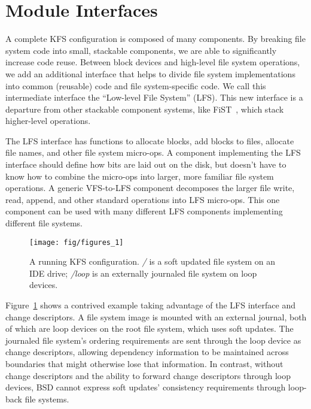 \section {Module Interfaces}
\label{sec:interfaces}

A complete KFS configuration is composed of many components. By breaking file
system code into small, stackable components, we are able to significantly
increase code reuse. Between block devices and high-level file system
operations, we add an additional interface that helps to divide file system
implementations into common (reusable) code and file system-specific code. We
call this intermediate interface the ``Low-level File System'' (LFS). This new
interface is a departure from other stackable component systems, like
FiST~\cite{zadok00fist}, which stack higher-level operations.

The LFS interface has functions to allocate blocks, add blocks to files,
allocate file names, and other file system micro-ops. A component implementing
the LFS interface should define how bits are laid out on the disk, but doesn't
have to know how to combine the micro-ops into larger, more familiar file system
operations. A generic VFS-to-LFS component decomposes the larger file write,
read, append, and other standard operations into LFS micro-ops. This one
component can be used with many different LFS components implementing different
file systems.

\begin{figure}[tb]
  \centering
  \texttt{[image: fig/figures\_1]}
  \caption{A running KFS configuration. {\it/} is a soft updated
    file system on an IDE drive; {\it/loop} is an externally journaled
    file system on loop devices.}
  \label{fig:kfs-graph}
\end{figure}

Figure~\ref{fig:kfs-graph} shows a contrived example taking advantage of the LFS
interface and change descriptors. A file system image is mounted with an
external journal, both of which are loop devices on the root file system, which
uses soft updates. The journaled file system's ordering requirements are sent
through the loop device as change descriptors, allowing dependency information
to be maintained across boundaries that might otherwise lose that information.
In contrast, without change descriptors and the ability to forward change
descriptors through loop devices, BSD cannot express soft updates' consistency
requirements through loop-back file systems.
